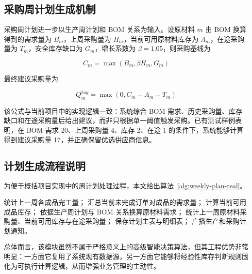 \subsection{采购周计划生成机制}

采购周计划进一步以生产周计划和 BOM 关系为输入。设原材料 $m$ 由 BOM 换算得到的需求量为 $B_m$，上周采购量为 $H_m$，当前可用原材料库存为 $A_m$，在途采购量为 $T_m$，安全库存缺口为 $G_m$，增长系数为 $\beta = 1.05$，则采购基线为

\begin{equation}
C_m = \max(B_m, \beta H_m, G_m)
\end{equation}

最终建议采购量为

\begin{equation}
Q_m^{buy} = \max(0, C_m - A_m - T_m)
\end{equation}

该公式与当前项目中的实现逻辑一致：系统综合 BOM 需求、历史采购量、库存缺口和在途采购量后给出建议，而非只根据单一阈值触发采购。已有测试样例表明，在 BOM 需求 20、上周采购量 4、库存 2、在途 1 的条件下，系统能够计算得到建议采购量 17，并正确保留优选供应商信息。

\subsection{计划生成流程说明}

为便于概括项目实现中的周计划处理过程，本文给出算法~\ref{alg:weekly-plan-real}。

\begin{algorithm}[H]
    统计上一周各成品完工量；
    汇总当前未完成订单对成品的需求量；
    计算当前可用成品库存；
    依据生产周计划与 BOM 关系换算原材料需求；
    统计上一周原材料采购量、当前可用库存与在途采购量；
    保存计划主表与明细表；
    广播生产和采购计划通知。
    \caption{周计划自动生成流程}
    \label{alg:weekly-plan-real}
\end{algorithm}

总体而言，该模块虽然不属于严格意义上的高级智能决策算法，但其工程优势非常明显：一方面它复用了系统现有数据源，另一方面它能够将经验性库存判断规则固化为可执行计算逻辑，从而增强业务管理的主动性。

